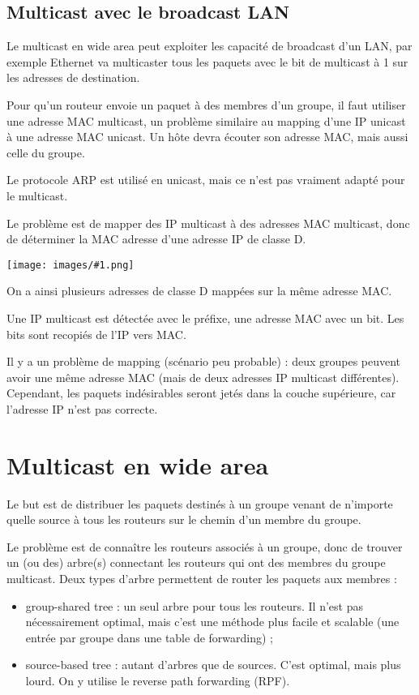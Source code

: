 \documentclass[10pt,a4paper]{report}
\newcommand{\dessin}[1]{\begin{center}\texttt{[image: images/\#1.png]}\end{center}}
\begin{document}
		\subsection{Multicast avec le broadcast LAN}
		
		Le multicast en wide area peut exploiter les capacité de broadcast d'un LAN, par exemple Ethernet va multicaster tous les paquets avec le bit de multicast à 1 sur les adresses de destination.
		
		Pour qu'un routeur envoie un paquet à des membres d'un groupe, il faut utiliser une adresse MAC multicast, un problème similaire au mapping d'une IP unicast à une adresse MAC unicast. Un hôte devra écouter son adresse MAC, mais aussi celle du groupe.
	
		Le protocole ARP est utilisé en unicast, mais ce n'est pas vraiment adapté pour le multicast.
		
		Le problème est de mapper des IP multicast à des adresses MAC multicast, donc de déterminer la MAC adresse d'une adresse IP de classe D.
	
		\dessin{3}
		
		On a ainsi plusieurs adresses de classe D mappées sur la même adresse MAC.
	
		Une IP multicast est détectée avec le préfixe, une adresse MAC avec un bit. Les bits sont recopiés de l'IP vers MAC.
	
		Il y a un problème de mapping (scénario peu probable) : deux groupes peuvent avoir une même adresse MAC (mais de deux adresses IP multicast différentes). Cependant, les paquets indésirables seront jetés dans la couche supérieure, car l'adresse IP n'est pas correcte.
	
	\section{Multicast en wide area}
	
	Le but est de distribuer les paquets destinés à un groupe venant de n'importe quelle source à tous les routeurs sur le chemin d'un membre du groupe.
	
	Le problème est de connaître les routeurs associés à un groupe, donc de trouver un (ou des) arbre(s) connectant les routeurs qui ont des membres du groupe multicast. Deux types d'arbre permettent de router les paquets aux membres :
	
	\begin{itemize}
		\item group-shared tree : un seul arbre pour tous les routeurs. Il n'est pas nécessairement optimal, mais c'est une méthode plus facile et scalable (une entrée par groupe dans une table de forwarding) ;
		\item source-based tree : autant d'arbres que de sources. C'est optimal, mais plus lourd. On y utilise le reverse path forwarding (RPF).
	\end{itemize}
	
\end{document}

